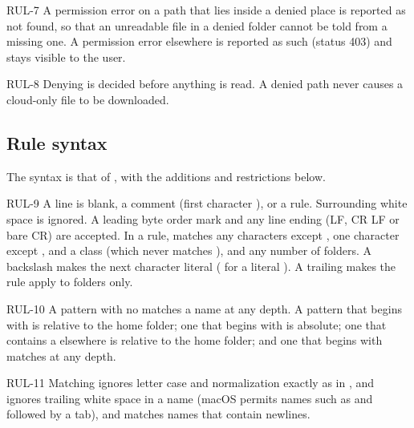 \begin{req}{RUL-7}
A permission error on a path that lies inside a denied place is reported as not
found, so that an unreadable file in a denied folder cannot be told from a missing
one.  A permission error elsewhere is reported as such (status 403) and stays visible
to the user.
\end{req}

\begin{req}{RUL-8}
Denying is decided before anything is read.  A denied path never causes a cloud-only
file to be downloaded.
\end{req}

\subsection{Rule syntax}
\label{sec:rulefiles}

The syntax is that of , with the additions and restrictions below.

\begin{req}{RUL-9}
A line is blank, a comment (first character \code{\#}), or a rule.  Surrounding white
space is ignored.  A leading byte order mark and any line ending (LF, CR LF or bare
CR) are accepted.  In a rule, \code{*} matches any characters except \code{/},
 one character except \code{/}, \code{[abc]} and \code{[!abc]} a class
(which never matches \code{/}), and \code{**} any number of folders.  A backslash
makes the next character literal (\code{\textbackslash\#} for a literal \code{\#}).  A
trailing \code{/} makes the rule apply to folders only.
\end{req}

\begin{req}{RUL-10}
A pattern with no \code{/} matches a name at any depth.  A pattern that begins with
\code{\~{}/} is relative to the home folder; one that begins with \code{/} is
absolute; one that contains a \code{/} elsewhere is relative to the home folder; and
one that begins with \code{**/} matches at any depth.
\end{req}

\begin{req}{RUL-11}
Matching ignores letter case and normalization exactly as in , and ignores
trailing white space in a name (macOS permits names such as 
and  followed by a tab), and \code{**} matches names that contain newlines.
\end{req}


